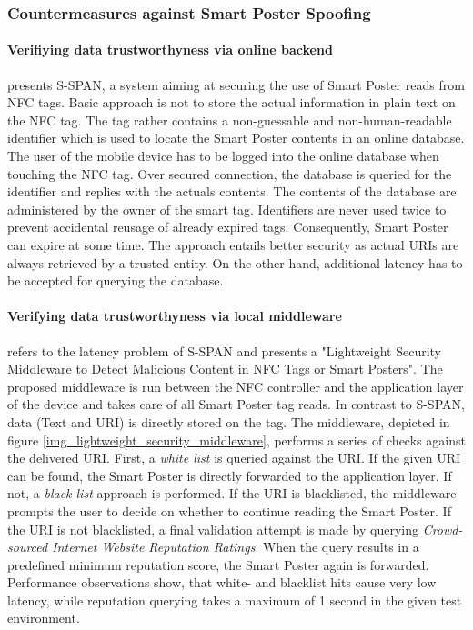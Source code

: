 \documentclass[12pt,a4paper]{article}
\begin{document}
\subsubsection{Countermeasures against Smart Poster Spoofing}

\paragraph{Verifiying data trustworthyness via online backend}
\cite{DBLP:conf/wowmom/WuQKKT12} presents S-SPAN, a system aiming at securing the use of Smart Poster reads from NFC tags. Basic approach is not to store the actual information in plain text on the NFC tag. The tag rather contains a non-guessable and non-human-readable identifier which is used to locate the Smart Poster contents in an online database. The user of the mobile device has to be logged into the online database when touching the NFC tag. Over secured connection, the database is queried for the identifier and replies with the actuals contents. The contents of the database are administered by the owner of the smart tag. Identifiers are never used twice to prevent accidental reusage of already expired tags. Consequently, Smart Poster can expire at some time. The approach entails better security as actual URIs are always retrieved by a trusted entity. On the other hand, additional latency has to be accepted for querying the database.

\paragraph{Verifying data trustworthyness via local middleware}
\cite{DBLP:conf/trustcom/HameedHHK14} refers to the latency problem of S-SPAN and presents a "Lightweight Security Middleware to Detect Malicious Content in NFC Tags or Smart Posters". The proposed middleware is run between the NFC controller and the application layer of the device and takes care of all Smart Poster tag reads. In contrast to S-SPAN, data (Text and URI) is directly stored on the tag. The middleware, depicted in figure \ref{img_lightweight_security_middleware}, performs a series of checks against the delivered URI. First, a \emph{white list} is queried against the URI. If the given URI can be found, the Smart Poster is directly forwarded to the application layer. If not, a \emph{black list} approach is performed. If the URI is blacklisted, the middleware prompts the user to decide on whether to continue reading the Smart Poster. If the URI is not blacklisted, a final validation attempt is made by querying \emph{Crowd-sourced Internet Website Reputation Ratings}. When the query results in a predefined minimum reputation score, the Smart Poster again is forwarded. Performance observations show, that white- and blacklist hits cause very low latency, while reputation querying takes a maximum of 1 second in the given test environment.
\end{document}

